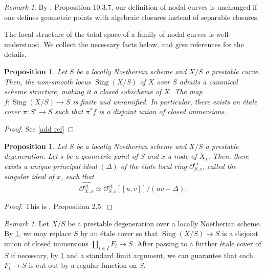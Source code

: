 \documentclass[a4paper,12pt]{amsart} %
\numberwithin{equation}{subsection}
\newcommand{\on}[1]{\operatorname{#1}}
\def\Sing{\operatorname{Sing}}
\theoremstyle{definition}
\theoremstyle{plain}%
\newtheorem{proposition}[definition]{Proposition}
\theoremstyle{remark}
\newtheorem{remark}[definition]{Remark}
\renewcommand{\O}{\mathcal{O}}
\begin{document}
\begin{remark}
	By \cite{Liu}, Proposition 10.3.7, our definition of nodal curves is unchanged if one defines geometric points with algebraic closures instead of separable closures.
\end{remark}

The local structure of the total space of a family of nodal curves is well-understood. We collect the necessary facts below, and give references for the details.

\begin{proposition}\label{proposition:singular_locus_is_discriminant_locus}
	Let $S$ be a locally Noetherian scheme and $X/S$ a prestable curve. Then, the non-smooth locus $\Sing(X/S)$ of $X$ over $S$ admits a canonical scheme structure, making it a closed subscheme of $X$. The map $f\colon\Sing(X/S) \to S$ is finite and unramified. In particular, there exists an \'etale cover $\pi\colon S' \to S$ such that $\pi^*f$ is a disjoint union of closed immersions.
\end{proposition}

\begin{proof}
	See \ref{add ref}
\end{proof}

\begin{proposition}\label{proposition:singular_ideals}
	Let $S$ be a locally Noetherian scheme and $X/S$ a prestable degeneration. Let $s$ be a geometric point of $S$ and $x$ a node of $X_s$. Then, there exists a unique principal ideal $(\Delta)$ of the étale local ring $\O^{\on{et}}_{S,s}$, called the \emph{singular ideal of $x$}, such that
	\[
	\widehat{\O^{\on{et}}_{X,x}}\simeq\widehat{\O^{\on{et}}_{S,s}}[[u,v]]/(uv-\Delta).
	\]
\end{proposition}

\begin{proof}
	This is \cite{Holmes}, Proposition 2.5.
\end{proof}

\begin{remark}
	Let $X/S$ be a prestable degeneration over a locally Noetherian scheme. By \ref{proposition:singular_locus_is_discriminant_locus}, we may replace $S$ by an \'etale cover so that $\Sing(X/S) \to S$ is a disjoint union of closed immersions $\coprod\limits_{i\in I} F_i \to S$. After passing to a further \'etale cover of $S$ if necessary, by \ref{proposition:singular_ideals} and a standard limit argument, we can guarantee that each $F_i \to S$ is cut out by a regular function on $S$.
\end{remark}
\end{document}
